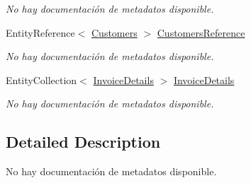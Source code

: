 \begin{DoxyCompactItemize}
\begin{DoxyCompactList}\small\item\em No hay documentación de metadatos disponible. \end{DoxyCompactList}\item 
Entity\-Reference$<$ \hyperlink{class_game_memory_1_1_customers}{Customers} $>$ \hyperlink{class_game_memory_1_1_invoices_af845c24d8cd3d0bad861299e693e5b0e}{Customers\-Reference}
\begin{DoxyCompactList}\small\item\em No hay documentación de metadatos disponible. \end{DoxyCompactList}\item 
Entity\-Collection$<$ \hyperlink{class_game_memory_1_1_invoice_details}{Invoice\-Details} $>$ \hyperlink{class_game_memory_1_1_invoices_a5ae6f975426aa0a9f86af85e03e23f10}{Invoice\-Details}
\begin{DoxyCompactList}\small\item\em No hay documentación de metadatos disponible. \end{DoxyCompactList}\end{DoxyCompactItemize}


\subsection{Detailed Description}
No hay documentación de metadatos disponible. 



